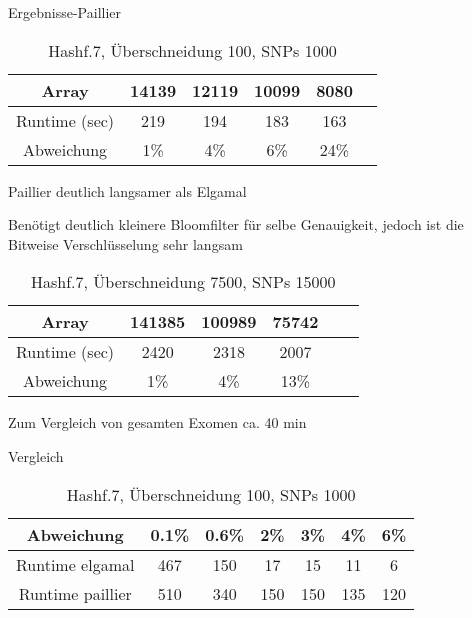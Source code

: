 \documentclass{beamer}
\begin{document}
\begin{frame}{Ergebnisse-Paillier}
	\begin{table}[h]
		
		\begin{tabular}{c|c|c|c|c|c}
			Array&14139&12119&10099&8080\\
			\hline
			Runtime (sec)&219&194&183&163\\
			Abweichung&1\%&4\%&6\%&24\%\\
			
			
		\end{tabular}
		\caption{Hashf.7, Überschneidung 100, SNPs 1000 }
		\label{tab:meinetabelle5}
	\end{table}
	
	\begin{arrowlist}
		\item Paillier deutlich langsamer als Elgamal
		\item Benötigt deutlich kleinere Bloomfilter für selbe Genauigkeit, jedoch ist die Bitweise Verschlüsselung sehr langsam
	\end{arrowlist}
\end{frame}
\begin{frame}
	\begin{table}[h]
		
		\begin{tabular}{c|c|c|c|c|c}
			Array&141385&100989&75742\\
			\hline
			Runtime (sec)&2420&2318&2007\\
			Abweichung&1\%&4\%& 13\%\\
			
			
		\end{tabular}
		\caption{Hashf.7, Überschneidung 7500, SNPs 15000 }
		\label{tab:meinetabelle6}
	\end{table}
	
	\begin{arrowlist}
		\item Zum Vergleich von gesamten Exomen ca. 40 min
 

		
	\end{arrowlist}

\end{frame}

\begin{frame}{Vergleich}
	\begin{table}[h]
		
		\begin{tabular}{c|c|c|c|c|c|c}
			Abweichung&0.1\%&0.6\%&2\%&3\%&4\%&6\%\\
			\hline
			Runtime elgamal&467&150&17&15&11&6\\
			Runtime paillier&510&340&150&150&135&120\\
			
			
		\end{tabular}
		\caption{Hashf.7, Überschneidung 100, SNPs 1000 }
		\label{tab:meinetabelle7}
	\end{table}

	
\end{frame}
\end{document}
